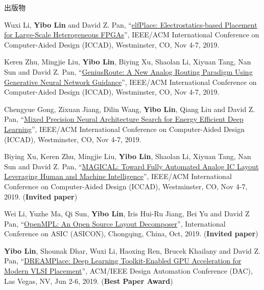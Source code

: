 \begin{rSection}{出版物}
\begin{description}[font=\normalfont, rightmargin=2em]
{}
            

\item[{[C33]}]{
        Wuxi Li, \textbf{Yibo Lin} and David Z. Pan, 
    ``\href{https://doi.org/10.1109/ICCAD45719.2019.8942075}{elfPlace: Electrostatics-based Placement for Large-Scale Heterogeneous FPGAs}'', 
    IEEE/ACM International Conference on Computer-Aided Design (ICCAD), Westminster, CO, Nov 4-7, 2019.
    
}
            

\item[{[C32]}]{
        Keren Zhu, Mingjie Liu, \textbf{Yibo Lin}, Biying Xu, Shaolan Li, Xiyuan Tang, Nan Sun and David Z. Pan, 
    ``\href{https://doi.org/10.1109/ICCAD45719.2019.8942164}{GeniusRoute: A New Analog Routing Paradigm Using Generative Neural Network Guidance}'', 
    IEEE/ACM International Conference on Computer-Aided Design (ICCAD), Westminster, CO, Nov 4-7, 2019.
    
}
            

\item[{[C31]}]{
        Chengyue Gong, Zixuan Jiang, Dilin Wang, \textbf{Yibo Lin}, Qiang Liu and David Z. Pan, 
    ``\href{https://doi.org/10.1109/ICCAD45719.2019.8942147}{Mixed Precision Neural Architecture Search for Energy Efficient Deep Learning}'', 
    IEEE/ACM International Conference on Computer-Aided Design (ICCAD), Westminster, CO, Nov 4-7, 2019.
    
}
            

\item[{[C30]}]{
        Biying Xu, Keren Zhu, Mingjie Liu, \textbf{Yibo Lin}, Shaolan Li, Xiyuan Tang, Nan Sun and David Z. Pan, 
    ``\href{https://doi.org/10.1109/ICCAD45719.2019.8942060}{MAGICAL: Toward Fully Automated Analog IC Layout Leveraging Human and Machine Intelligence}'', 
    IEEE/ACM International Conference on Computer-Aided Design (ICCAD), Westminster, CO, Nov 4-7, 2019.
    (\textbf{Invited paper})
}
            

\item[{[C29]}]{
        Wei Li, Yuzhe Ma, Qi Sun, \textbf{Yibo Lin}, Iris Hui-Ru Jiang, Bei Yu and David Z Pan, 
    ``\href{https://arxiv.org/abs/1809.07554}{OpenMPL: An Open Source Layout Decomposer}'', 
    International Conference on ASIC (ASICON), Chongqing, China, Oct, 2019.
    (\textbf{Invited paper})
}
            

\item[{[C28]}]{
        \textbf{Yibo Lin}, Shounak Dhar, Wuxi Li, Haoxing Ren, Brucek Khailany and David Z. Pan, 
    ``\href{https://doi.org/10.1145/3316781.3317803}{DREAMPlace: Deep Learning Toolkit-Enabled GPU Acceleration for Modern VLSI Placement}'', 
    ACM/IEEE Design Automation Conference (DAC), Las Vegas, NV, Jun 2-6, 2019.
    (\textbf{Best Paper Award})
}
            


\end{description}
\end{rSection}
